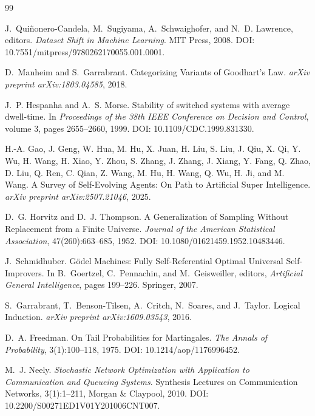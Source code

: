 \documentclass[11pt]{article}
\theoremstyle{definition}
\newcommand{\1}{\mathbf{1}}
\begin{document}
\begin{thebibliography}{99}

J.~Qui\~nonero-Candela, M.~Sugiyama, A.~Schwaighofer, and N.~D. Lawrence, editors.
\newblock \emph{Dataset Shift in Machine Learning}.
\newblock MIT Press, 2008. DOI: 10.7551/mitpress/9780262170055.001.0001.

D.~Manheim and S.~Garrabrant.
\newblock Categorizing Variants of Goodhart's Law.
\newblock \emph{arXiv preprint arXiv:1803.04585}, 2018.

J.~P. Hespanha and A.~S. Morse.
\newblock Stability of switched systems with average dwell-time.
\newblock In \emph{Proceedings of the 38th IEEE Conference on Decision and Control}, volume 3, pages 2655--2660, 1999. DOI: 10.1109/CDC.1999.831330.

H.-A. Gao, J. Geng, W. Hua, M. Hu, X. Juan, H. Liu, S. Liu, J. Qiu, X. Qi, Y. Wu, H. Wang, H. Xiao, Y. Zhou, S. Zhang, J. Zhang, J. Xiang, Y. Fang, Q. Zhao, D. Liu, Q. Ren, C. Qian, Z. Wang, M. Hu, H. Wang, Q. Wu, H. Ji, and M. Wang.
\newblock A Survey of Self-Evolving Agents: On Path to Artificial Super Intelligence.
\newblock \emph{arXiv preprint arXiv:2507.21046}, 2025.

D.~G. Horvitz and D.~J. Thompson.
\newblock A Generalization of Sampling Without Replacement from a Finite Universe.
\newblock \emph{Journal of the American Statistical Association}, 47(260):663--685, 1952. DOI: 10.1080/01621459.1952.10483446.

J.~Schmidhuber.
\newblock G\"odel Machines: Fully Self-Referential Optimal Universal Self-Improvers.
\newblock In B.~Goertzel, C.~Pennachin, and M.~Geisweiller, editors, \emph{Artificial General Intelligence}, pages 199--226. Springer, 2007.

S.~Garrabrant, T.~Benson-Tilsen, A.~Critch, N.~Soares, and J.~Taylor.
\newblock Logical Induction.
\newblock \emph{arXiv preprint arXiv:1609.03543}, 2016.

D.~A. Freedman.
\newblock On Tail Probabilities for Martingales.
\newblock \emph{The Annals of Probability}, 3(1):100--118, 1975. DOI: 10.1214/aop/1176996452.

M.~J. Neely.
\newblock \emph{Stochastic Network Optimization with Application to Communication and Queueing Systems}.
\newblock Synthesis Lectures on Communication Networks, 3(1):1--211, Morgan \& Claypool, 2010. DOI: 10.2200/S00271ED1V01Y201006CNT007.


\end{thebibliography}
\end{document}
